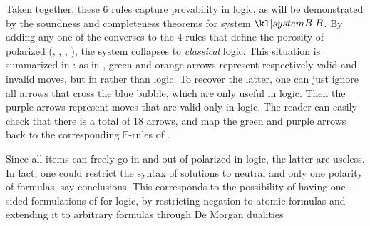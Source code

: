 \begin{description}
  Taken together, these $6$ rules capture provability in
  \emph{} logic, as will be demonstrated by the soundness and
  completeness theorems for system $\sysB$. By adding any one of the converses
  to the $4$ rules that define the porosity of polarized  (, , ,
  ), the system collapses to \emph{classical} logic.
  This situation is summarized in : as in
  , green and orange arrows represent respectively valid
  and invalid moves, but in  rather than  logic.
  To recover the latter, one can just ignore all arrows that cross the blue
  bubble, which are only useful in  logic. Then the purple
  arrows represent moves that are valid only in  logic. The reader can
  easily check that there is a total of $18$ arrows, and map the green and
  purple arrows back to the corresponding $\mathbb{F}$-rules of
  .

  \begin{remark}
    Since all items can freely go in and out of polarized  in 
    logic, the latter are useless. In fact, one could restrict the syntax of
    solutions to neutral  and only one polarity of formulas, say
    conclusions. This corresponds to the possibility of having one-sided
    formulations of  for  logic, by restricting negation
    to atomic formulas and extending it to arbitrary formulas through De Morgan
    dualities
  \end{remark}
  

\end{description}
